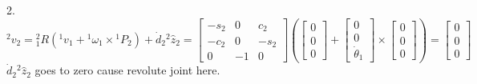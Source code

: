 \documentclass{article}
\begin{document}
2. ${}^{2}v_{2}={}^{2}_1R({}^1 v_1 + {}^1 \omega_1 \times {}^1 P_{2}) + \dot{d}_{2} {}^{2}\hat{z}_{2}=
\begin{bmatrix}
-s_2 & 0 & c_2\\
-c_2 & 0 & -s_2\\
0 & -1 & 0
\end{bmatrix} (\begin{bmatrix}
    0\\
    0\\
    0
\end{bmatrix} + \begin{bmatrix}
    0\\
    0\\
    \dot{\theta}_1
\end{bmatrix} \times \begin{bmatrix}
    0\\
    0\\
    0
\end{bmatrix})=
\begin{bmatrix}
    0\\
    0\\
    0
\end{bmatrix}$ $\dot{d}_{2} {}^{2}\hat{z}_{2}$ goes to zero cause revolute joint here.\\\\
\end{document}
